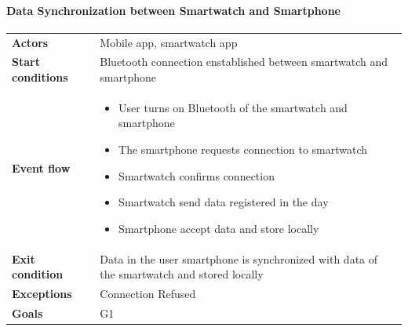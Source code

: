 \paragraph{Data Synchronization between Smartwatch and Smartphone}
\begin{center}
\begin{table}[H]
\centering
\begin{tabular}{l|p{}}
\textbf{Actors} & 
Mobile app, smartwatch app \\
\textbf{Start conditions} & Bluetooth connection enstablished between smartwatch and smartphone \\
\textbf{Event flow}  & \begin{minipage}[t]{0.7\textwidth}
    \begin{itemize}
        \item User turns on Bluetooth of the smartwatch and smartphone


        \item The smartphone requests connection to smartwatch

        \item Smartwatch confirms connection
        \item Smartwatch send data registered in the day 
        \item Smartphone accept data and store locally

    \end{itemize}
    
\end{minipage}\\
\textbf{Exit condition} & Data in the user smartphone is synchronized with data of the smartwatch and stored locally \\
\textbf{Exceptions} & Connection Refused \\
\textbf{Goals} & G1
\end{tabular}

\end{table}
\end{center}

